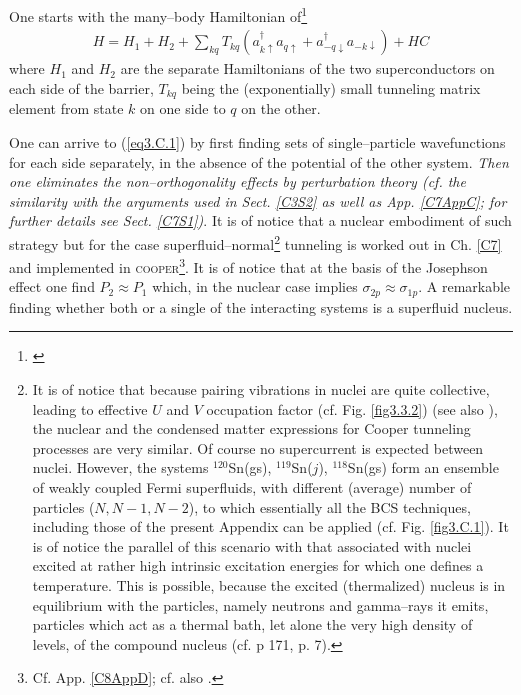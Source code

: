 One starts with the many--body Hamiltonian of\footnote{\cite{Cohen:62}}
\begin{align}\label{eq3.C.1}
H=H_1+H_2+\sum_{kq}T_{kq}(a_{k\uparrow}^\dagger a_{q\uparrow}+a_{-q\downarrow}^\dagger a_{-k\downarrow})+HC
\end{align}
where $H_1$ and $H_2$ are the separate Hamiltonians of the two superconductors on each side of the barrier, $T_{kq}$ being the (exponentially) small tunneling matrix element from state $k$ on one side to $q$ on the other.


One can arrive to  (\ref{eq3.C.1}) by first finding sets of single--particle wavefunctions for each side separately, in the absence of the potential of the other system. \textit{Then one eliminates the non--orthogonality effects by perturbation theory (cf. the similarity with the arguments used in Sect. \ref{C3S2} as well as App. \ref{C7AppC}; for further details see Sect. \ref{C7S1})}. It is of notice that a nuclear embodiment of such strategy but for the case superfluid--normal\footnote{\label{f45}It is of notice that because  pairing vibrations in nuclei are quite collective, leading to effective $U$ and $V$ occupation factor (cf. Fig. \ref{fig3.3.2}) (see also \cite{Potel:13b}), the nuclear and the condensed matter expressions for Cooper tunneling processes are very similar. Of course no supercurrent is expected between nuclei. However, the systems $^{120}$Sn(gs), $^{119}$Sn($j$), $^{118}$Sn(gs) form an ensemble of weakly coupled Fermi superfluids, with different (average) number of particles ($N,N-1,N-2$), to which essentially all the BCS techniques, including those of the present Appendix can be applied (cf. Fig. \ref{fig3.C.1}). It is of notice the parallel of this scenario with that associated with nuclei excited at rather high intrinsic excitation energies for which one defines a temperature. This is possible, because the excited (thermalized) nucleus is in equilibrium with the particles, namely neutrons and gamma--rays it emits, particles which act as a thermal bath, let alone the very high density of levels, of the compound nucleus (cf. \cite{Bertsch:05} p 171, \cite{Bortignon:98} p. 7).} tunneling is worked out in Ch. \ref{C7} and implemented in \textsc{cooper}\footnote{Cf. App. \ref{C8AppD}; cf. also \cite{Broglia:04a}.}. It is of notice that at the basis of the Josephson effect one find $P_2\approx P_1$ which, in the nuclear case implies $\sigma_{2p}\approx\sigma_{1p}$. A remarkable finding whether both or a single of the interacting systems is a superfluid nucleus. 


